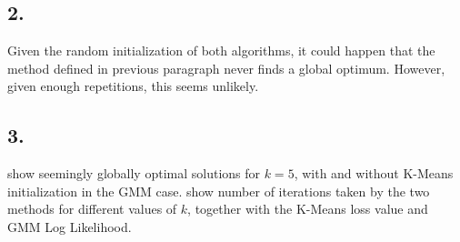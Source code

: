 \documentclass[a4paper,11pt]{article}
\begin{document}
\subsection*{2.}

Given the random initialization of both algorithms, it could happen that the method defined in previous paragraph never finds a global optimum. However, given enough repetitions, this seems unlikely.

\subsection*{3.}

 show seemingly globally optimal solutions for $k=5$, with and without K-Means initialization in the GMM case.
 show number of iterations taken by the two methods for different values of $k$, together with the K-Means loss value and GMM Log Likelihood.
\end{document}
